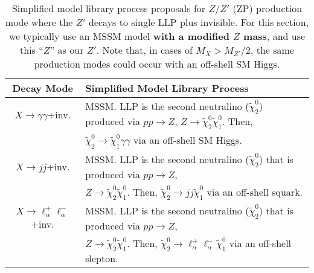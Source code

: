\begin{table}
\begin{center}
\begin{tabular}{ |c|l|} 
 \hline
Decay Mode & Simplified Model Library Process \\
\hline\hline
$X\rightarrow \gamma\gamma$+inv. & MSSM. LLP is the second neutralino  ($\tilde\chi_2^0$)   produced via $pp\rightarrow Z$, $Z\rightarrow\tilde\chi_2^0\tilde\chi_1^0$.  Then,  \\
&    $\tilde\chi_2^0\rightarrow\tilde\chi_1^0\gamma\gamma$ via an off-shell SM Higgs. \\
\hline
$X\rightarrow jj$+inv.& MSSM. LLP is the second neutralino ($\tilde\chi_2^0$) that is produced via $pp\rightarrow Z $,  \\
& $Z\rightarrow \tilde\chi_2^0\tilde\chi_1^0$. Then, $\tilde\chi_2^0\rightarrow jj\tilde\chi_1^0$  via an  off-shell  squark.\\
\hline
$X\rightarrow \ell_\alpha^+\ell_\alpha^-$+inv. & MSSM. LLP is the second neutralino ($\tilde\chi_2^0$) that is produced via $pp\rightarrow Z$,  \\
& $Z\rightarrow \tilde\chi_2^0\tilde\chi_1^0$.  Then, $\tilde\chi_2^0\rightarrow \ell_\alpha^+\ell_\alpha^-\tilde\chi_1^0$  via an  off-shell  slepton.\\

\hline
\end{tabular}
\end{center}
\caption{Simplified model library process proposals for $Z/Z'$ (ZP) production mode where the $Z'$ decays to single LLP plus invisible. For this section, we typically use an MSSM model {\bf with a modified $Z$ mass}, and use this ``$Z$'' as our $Z'$. Note that, in cases of $M_X>M_{Z'}/2$, the same production modes could occur with an off-shell SM Higgs. }\label{tab:Zp_single_neutral_library}
\end{table}

